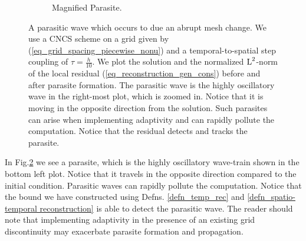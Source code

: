 \documentclass[final]{amsart}
\numberwithin{equation}{section}
\begin{document}
\begin{figure}[H]
\begin{subfigure}[b]{.3\textwidth}
		\caption{\label{fig:CNCS_parasite_1D_2_zoom}
			Magnified Parasite.
		}
	\end{subfigure}
\caption{A parasitic wave which occurs to due an abrupt mesh change.  We use a CNCS scheme on a grid given by (\ref{eq_grid_spacing_piecewise_nonu}) and a temporal-to-spatial step coupling of $\tau=\frac{h}{10}$.  We plot the solution and the normalized $\operatorname L^{2}$-norm of the local residual (\ref{eq_reconstruction_gen_cons}) before and after parasite formation.  The parasitic wave is the highly oscillatory wave in the right-most plot, which is zoomed in.  Notice that it is moving in the opposite direction from the solution. Such parasites can arise when implementing adaptivity and can rapidly pollute the computation. Notice that the residual detects and tracks the parasite.}
\label{fig:CNCS_parasite}
\end{figure}

			

In Fig.\ref{fig:CNCS_parasite} we see a parasite, which is the highly oscillatory wave-train shown in the bottom left plot.  Notice that it travels in the opposite direction compared to the initial condition.    Parasitic waves can rapidly pollute the computation.     Notice that the bound we have constructed using Defns. \ref{defn_temp_rec} and \ref{defn_spatio-temporal reconstruction} is able to detect the parasitic wave.  The reader should note that implementing adaptivity in the presence of an existing grid discontinuity may exacerbate parasite formation and propagation.
\end{document}
